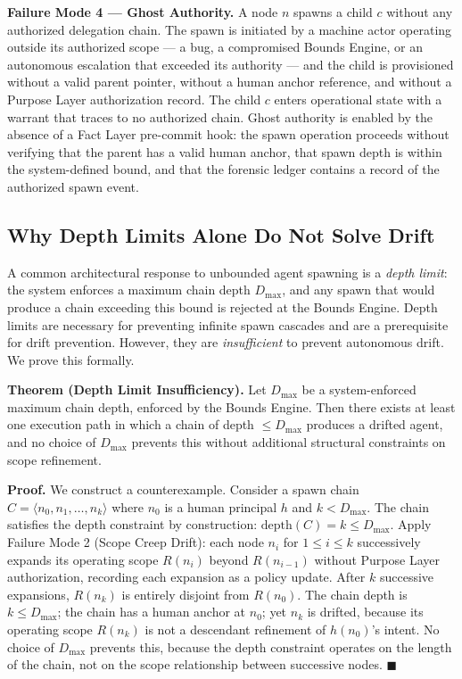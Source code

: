 \medskip
\noindent\textbf{Failure Mode 4 — Ghost Authority.}
A node $n$ spawns a child $c$ without any authorized delegation chain. The spawn is initiated by a machine actor operating outside its authorized scope — a bug, a compromised Bounds Engine, or an autonomous escalation that exceeded its authority — and the child is provisioned without a valid parent pointer, without a human anchor reference, and without a Purpose Layer authorization record. The child $c$ enters operational state with a warrant that traces to no authorized chain. Ghost authority is enabled by the absence of a Fact Layer pre-commit hook: the spawn operation proceeds without verifying that the parent has a valid human anchor, that spawn depth is within the system-defined bound, and that the forensic ledger contains a record of the authorized spawn event.

\subsection{Why Depth Limits Alone Do Not Solve Drift}
\label{sec:rs-drift-depth-limits}

A common architectural response to unbounded agent spawning is a \emph{depth limit}: the system enforces a maximum chain depth $D_{\max}$, and any spawn that would produce a chain exceeding this bound is rejected at the Bounds Engine. Depth limits are necessary for preventing infinite spawn cascades and are a prerequisite for drift prevention. However, they are \emph{insufficient} to prevent autonomous drift. We prove this formally.

\medskip
\noindent\textbf{Theorem (Depth Limit Insufficiency).}
Let $D_{\max}$ be a system-enforced maximum chain depth, enforced by the Bounds Engine. Then there exists at least one execution path in which a chain of depth $\leq D_{\max}$ produces a drifted agent, and no choice of $D_{\max}$ prevents this without additional structural constraints on scope refinement.

\medskip
\noindent\textbf{Proof.} We construct a counterexample. Consider a spawn chain $C = \langle n_0, n_1, \ldots, n_k \rangle$ where $n_0$ is a human principal $h$ and $k < D_{\max}$. The chain satisfies the depth constraint by construction: $\mathrm{depth}(C) = k \leq D_{\max}$. Apply Failure Mode 2 (Scope Creep Drift): each node $n_i$ for $1 \leq i \leq k$ successively expands its operating scope $R(n_i)$ beyond $R(n_{i-1})$ without Purpose Layer authorization, recording each expansion as a policy update. After $k$ successive expansions, $R(n_k)$ is entirely disjoint from $R(n_0)$. The chain depth is $k \leq D_{\max}$; the chain has a human anchor at $n_0$; yet $n_k$ is drifted, because its operating scope $R(n_k)$ is not a descendant refinement of $h(n_0)$'s intent. No choice of $D_{\max}$ prevents this, because the depth constraint operates on the length of the chain, not on the scope relationship between successive nodes. $\blacksquare$


